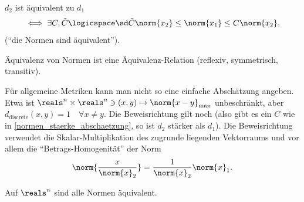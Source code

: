 \begin{folgerung*}
    \( d_2 \) ist äquivalent zu \( d_1 \)
    \begin{align*}
        \iff \exists C,\tilde{C} \logicspace\text{\sd} \tilde{C}\norm{x_2}\leq \norm{x_1}\leq C\norm{x_2},
    \end{align*}
    (\enquote{die Normen sind äquivalent}).
\end{folgerung*}
\begin{bemerkung*}
    Äquivalenz von Normen ist eine Äquivalenz-Relation (reflexiv, symmetrisch, transitiv).
\end{bemerkung*}
\begin{bemerkung*}
    Für allgemeine Metriken kann man nicht so eine einfache Abschätzung angeben. Etwa ist \( \reals^n\times \reals^n\ni (x,y)\mapsto \norm{x-y}_{\max} \) unbeschränkt, aber \( d_{\text{discrete}}(x,y)=1\quad \forall x\neq y \). Die Beweisrichtung \rueck gilt noch (also gibt es ein \( C \) wie in \ref{normen_staerke_abschaetzung}, so ist \( d_2 \) stärker als \( d_1 \)). Die Beweisrichtung \hin verwendet die Skalar-Multiplikation des zugrunde liegenden Vektorraums und vor allem die \enquote{Betrags-Homogenität} der Norm
    \begin{align*}
        \norm{\frac{x}{\norm{x}_2}}=\frac{1}{\norm{x}_2}\norm{x}_1.
    \end{align*}
\end{bemerkung*}
\begin{satz}\label{r_alle_normen_aequivalent}
    Auf \( \reals^n \) sind alle Normen äquivalent.
\end{satz}
